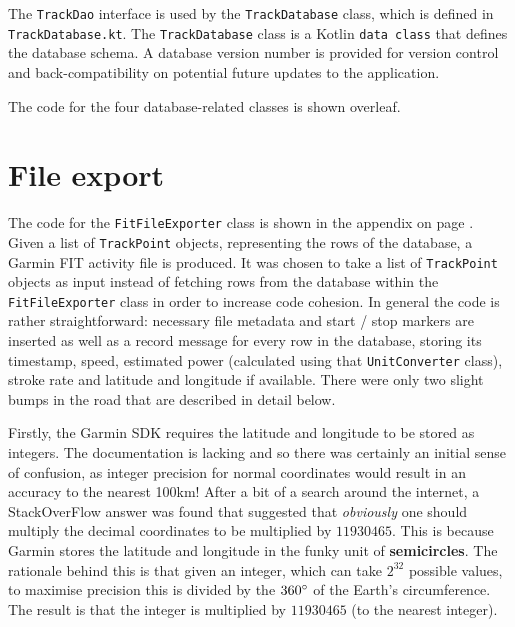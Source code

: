 \documentclass[11pt,twoside,a4paper]{report}
\begin{document}
The \texttt{TrackDao} interface is used by the \texttt{TrackDatabase} class, which is defined in \texttt{TrackDatabase.kt}. The \texttt{TrackDatabase} class is a Kotlin \texttt{data class} that defines the database schema. A database version number is provided for version control and back-compatibility on potential future updates to the application.

The code for the four database-related classes is shown overleaf.



\section{File export}

The code for the \texttt{FitFileExporter} class is shown in the appendix on page \pageref{FitFileExporterStart}. Given a list of \texttt{TrackPoint} objects, representing the rows of the database, a Garmin FIT activity file is produced. It was chosen to take a list of \texttt{TrackPoint} objects as input instead of fetching rows from the database within the \texttt{FitFileExporter} class in order to increase code cohesion. In general the code is rather straightforward: necessary file metadata and start / stop markers are inserted as well as a record message for every row in the database, storing its timestamp, speed, estimated power (calculated using that \texttt{UnitConverter} class), stroke rate and latitude and longitude if available. There were only two slight bumps in the road that are described in detail below.

Firstly, the Garmin SDK requires the latitude and longitude to be stored as integers. The documentation is lacking and so there was certainly an initial sense of confusion, as integer precision for normal coordinates would result in an accuracy to the nearest 100km! After a bit of a search around the internet, a StackOverFlow answer \cite{garmin_coordinates} was found that suggested that \textit{obviously} one should multiply the decimal coordinates to be multiplied by $11930465$. This is because Garmin stores the latitude and longitude in the funky unit of \textbf{semicircles}. The rationale behind this is that given an integer, which can take $2^{32}$ possible values, to maximise precision this is divided by the $360\degree$ of the Earth's circumference. The result is that the integer is multiplied by $11930465$ (to the nearest integer).
\end{document}
